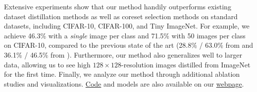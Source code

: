 Extensive experiments show that our method handily outperforms existing dataset distillation methods as well as coreset selection methods on standard datasets, including CIFAR-10, CIFAR-100, and Tiny ImageNet. For example, we achieve 46.3\% with a \emph{single} image per class and 71.5\% with 50 images per class on CIFAR-10, compared to the previous state of the art (28.8\% / 63.0\% from \cite{dsa, dm} and 36.1\% / 46.5\% from \cite{nguyen2021dataset}).
Furthermore, our method also generalizes well to larger data, allowing us to see high $128\times128$-resolution images distilled from ImageNet \cite{deng2009imagenet} for the first time. Finally, we analyze our method through additional ablation studies and visualizations. %
\href{https://github.com/GeorgeCazenavette/mtt-distillation}{Code} and models are also available on our \href{https://georgecazenavette.github.io/mtt-distillation/}{webpage}.
